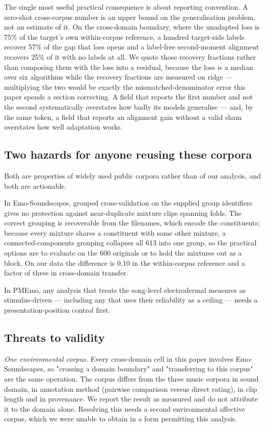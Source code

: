 The single most useful practical consequence is about reporting convention. A
zero-shot cross-corpus number is an upper bound on the generalisation problem,
not an estimate of it. On the cross-domain boundary, where the unadapted loss
is 75\% of the target's own within-corpus reference, a hundred target-side
labels recover 57\% of the gap that loss opens and a label-free second-moment
alignment recovers 25\% of it with no labels at all. We quote those recovery
fractions rather than composing them with the loss into a residual, because the
loss is a median over six algorithms while the recovery fractions are measured
on ridge --- multiplying the two would be exactly the mismatched-denominator
error this paper spends a section correcting. A field that reports the first
number and not the second systematically overstates how badly its models
generalise --- and, by the same token, a field that reports an alignment gain
without a valid sham overstates how well adaptation works.

\subsection{Two hazards for anyone reusing these corpora}

Both are properties of widely used public corpora rather than of our analysis,
and both are actionable.

In Emo-Soundscapes, grouped cross-validation on the supplied group identifiers
gives no protection against near-duplicate mixture clips spanning folds. The
correct grouping is recoverable from the filenames, which encode the
constituents; because every mixture shares a constituent with some other
mixture, a connected-components grouping collapses all 613 into one group, so
the practical options are to evaluate on the 600 originals or to hold the
mixtures out as a block. On our data the difference is 0.10 in the
within-corpus reference and a factor of three in cross-domain transfer.

In PMEmo, any analysis that treats the song-level electrodermal measures as
stimulus-driven --- including any that uses their reliability as a ceiling ---
needs a presentation-position control first.

\subsection{Threats to validity}
\label{sec:threats}

\emph{One environmental corpus.} Every cross-domain cell in this paper
involves Emo-Soundscapes, so "crossing a domain boundary" and "transferring to
this corpus" are the same operation. The corpus differs from the three music
corpora in sound domain, in annotation method (pairwise comparison versus
direct rating), in clip length and in provenance. We report the result as
measured and do not attribute it to the domain alone. Resolving this needs a
second environmental affective corpus, which we were unable to obtain in a
form permitting this analysis.

